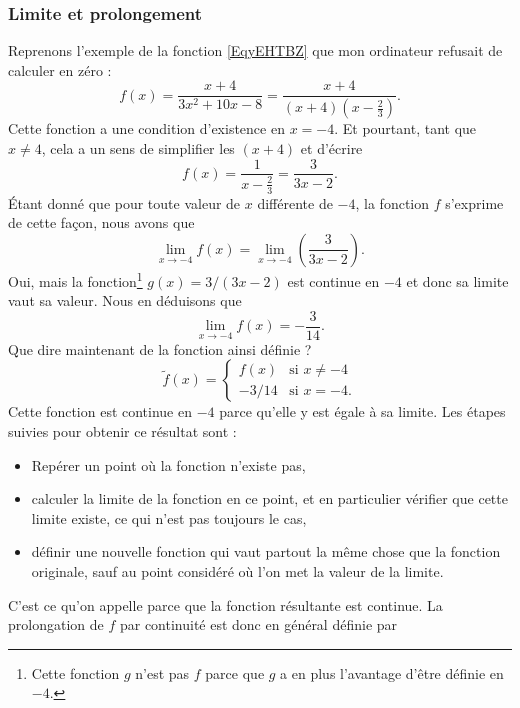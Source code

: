 \subsubsection{Limite et prolongement}

Reprenons l'exemple de la fonction \eqref{EqyEHTBZ} que mon ordinateur refusait de calculer en zéro :
\begin{equation}
f(x)=\frac{ x+4 }{ 3x^2+10x-8 }=\frac{ x+4 }{ (x+4)\left( x-\frac{ 2 }{ 3 } \right) }.
\end{equation}
Cette fonction a une condition d'existence en $x=-4$. Et pourtant, tant que $x\neq 4$, cela a un sens de simplifier les $(x+4)$ et d'écrire
\[
  f(x)=\frac{ 1 }{ x-\frac{ 2 }{ 3 } }=\frac{ 3 }{ 3x-2 }.
\]
Étant donné que pour toute valeur de $x$ différente de $-4$, la fonction $f$ s'exprime de cette façon, nous avons que
\[
  \lim_{x\to -4}f(x)=\lim_{x\to -4}\left(\frac{ 3 }{ 3x-2 }\right).
\]
Oui, mais la fonction\footnote{Cette fonction $g$ n'est pas $f$ parce que $g$ a en plus l'avantage d'être définie en $-4$.} $g(x)=3/(3x-2)$ est continue en $-4$ et donc sa limite vaut sa valeur. Nous en déduisons que
\[
  \lim_{x\to -4}f(x)=-\frac{ 3 }{ 14 }.
\]
Que dire maintenant de la fonction ainsi définie ?
\begin{equation}
\tilde f(x)=
\begin{cases}
f(x)&\text{si }x\neq -4\\
-3/14&\text{si }x=-4.
\end{cases}
\end{equation}
Cette fonction est continue en $-4$ parce qu'elle y est égale à sa limite. Les étapes suivies pour obtenir ce résultat sont :
\begin{itemize}
\item Repérer un point où la fonction n'existe pas,
\item calculer la limite de la fonction en ce point, et en particulier vérifier que cette limite existe, ce qui n'est pas toujours le cas,
\item définir une nouvelle fonction qui vaut partout la même chose que la fonction originale, sauf au point considéré où l'on met la valeur de la limite.
\end{itemize}
C'est ce qu'on appelle  parce que la fonction résultante est continue. La prolongation de $f$ par continuité est donc en général définie par
